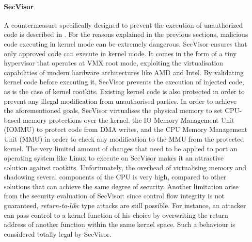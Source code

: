 \paragraph{SecVisor}
A countermeasure specifically designed to prevent the execution of unauthorized code is described in \cite{SecVisor}. For the reasons explained in the previous sections, malicious code executing in kernel mode can be extremely dangerous. SecVisor ensures that only approved code can execute in kernel mode. It comes in the form of a tiny hypervisor that operates at VMX root mode, exploiting the virtualisation capabilities of modern hardware architectures like AMD and Intel. By validating kernel code before executing it, SecVisor prevents the execution of injected code, as is the case of kernel rootkits. 
Existing kernel code is also protected in order to prevent any illegal modification from unauthorised parties. In order to achieve the aforementioned goals, SecVisor virtualises the physical memory to set CPU-based memory protections over the kernel, the IO Memory Management Unit (IOMMU) to protect code from DMA writes, and the CPU Memory Management Unit (MMU) in order to check any modification to the MMU from the protected kernel. 
The very limited amount of changes that need to be applied to port an operating system like Linux to execute on SecVisor makes it an attractive solution against rootkits. Unfortunately, the overhead of virtualising memory and shadowing several components of the CPU is very high, compared to other solutions that can achieve the same degree of security.
Another limitation arise from the security evaluation of SecVisor: since control flow integrity is not guaranteed, \emph{return-to-libc} type attacks are still possible. For instance, an attacker can pass control to a kernel function of his choice by overwriting the return address of another function within the same kernel space. Such a  behaviour is considered totally legal by SecVisor.

